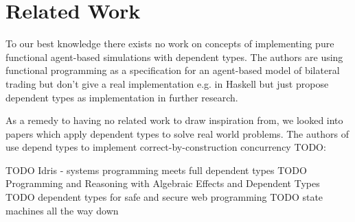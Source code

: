 \section{Related Work}
\label{sec:related_work}
To our best knowledge there exists no work on concepts of implementing pure functional agent-based simulations with dependent types. The authors \cite{botta_functional_2011} are using functional programming as a specification for an agent-based model of bilateral trading but don't give a real implementation e.g. in Haskell but just propose dependent types as implementation in further research.

As a remedy to having no related work to draw inspiration from, we looked into papers which apply dependent types to solve real world problems. 
The authors of \cite{brady_correct-by-construction_2010} use depend types to implement correct-by-construction concurrency TODO:

TODO \cite{brady_idris_2011} Idris - systems programming meets full dependent types
TODO \cite{brady_programming_2013} Programming and Reasoning with Algebraic Effects and Dependent Types 
TODO \cite{fowler_dependent_2014} dependent types for safe and secure web programming
TODO \cite{brady_state_2016} state machines all the way down